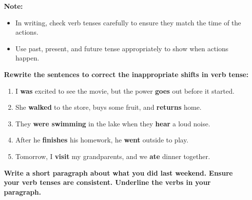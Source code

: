 \documentclass[12pt]{article}
\begin{document}
\vspace{1em}

\begin{tcolorbox}[colframe=black!40, colback=gray!5, 
coltitle=black, colbacktitle=black!20, fonttitle=\bfseries\Large, 
title=Additional Notes, halign title=center, left=5pt, right=5pt, top=5pt, bottom=15pt]
\textbf{Note:}
\begin{itemize}
    \item In writing, check verb tenses carefully to ensure they match the time of the actions.
    \item Use past, present, and future tense appropriately to show when actions happen.
\end{itemize}
\end{tcolorbox}

\vspace{1em}

\begin{tcolorbox}[colframe=black!60, colback=white, 
coltitle=black, colbacktitle=black!15, fonttitle=\bfseries\Large, 
title=Independent Practice, halign title=center, left=10pt, right=10pt, top=10pt, bottom=15pt]
\textbf{Rewrite the sentences to correct the inappropriate shifts in verb tense:}
\begin{enumerate}[itemsep=3em]
    \item I \textbf{was} excited to see the movie, but the power \textbf{goes} out before it started.
    \item She \textbf{walked} to the store, buys some fruit, and \textbf{returns} home.
    \item They \textbf{were swimming} in the lake when they \textbf{hear} a loud noise.
    \item After he \textbf{finishes} his homework, he \textbf{went} outside to play.
    \item Tomorrow, I \textbf{visit} my grandparents, and we \textbf{ate} dinner together.
\end{enumerate}
\end{tcolorbox}

\vspace{1em}

\begin{tcolorbox}[colframe=black!60, colback=white, 
coltitle=black, colbacktitle=black!15, fonttitle=\bfseries\Large, 
title=Exit Ticket, halign title=center, left=10pt, right=10pt, top=5pt, bottom=15pt]

\textbf{Write a short paragraph about what you did last weekend. Ensure your verb tenses are consistent. Underline the verbs in your paragraph.}

\vspace{10cm}

\end{tcolorbox}
\end{document}
